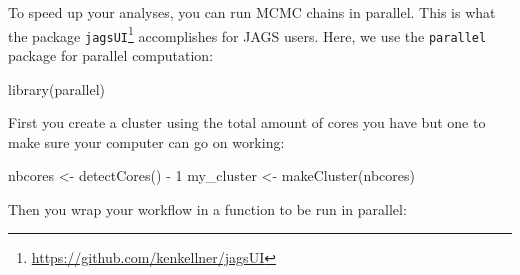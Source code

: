 \documentclass[
  12pt,
]{krantz}
\newenvironment{Shaded}{\begin{snugshade}}{\end{snugshade}}
\newcommand{\DecValTok}[1]{\textcolor[rgb]{0.00,0.00,0.81}{#1}}
\newcommand{\FunctionTok}[1]{\textcolor[rgb]{0.00,0.00,0.00}{#1}}
\newcommand{\NormalTok}[1]{#1}
\newcommand{\OtherTok}[1]{\textcolor[rgb]{0.56,0.35,0.01}{#1}}
\newcommand{\SpecialCharTok}[1]{\textcolor[rgb]{0.00,0.00,0.00}{#1}}
\begin{document}
To speed up your analyses, you can run MCMC chains in parallel. This is what the package \texttt{jagsUI}\footnote{\url{https://github.com/kenkellner/jagsUI}} accomplishes for JAGS users. Here, we use the \texttt{parallel} package for parallel computation:

\begin{Shaded}
\begin{Highlighting}[]
\FunctionTok{library}\NormalTok{(parallel)}
\end{Highlighting}
\end{Shaded}

First you create a cluster using the total amount of cores you have but one to make sure your computer can go on working:

\begin{Shaded}
\begin{Highlighting}[]
\NormalTok{nbcores }\OtherTok{\textless{}{-}} \FunctionTok{detectCores}\NormalTok{() }\SpecialCharTok{{-}} \DecValTok{1}
\NormalTok{my\_cluster }\OtherTok{\textless{}{-}} \FunctionTok{makeCluster}\NormalTok{(nbcores)}
\end{Highlighting}
\end{Shaded}

Then you wrap your workflow in a function to be run in parallel:
\end{document}
